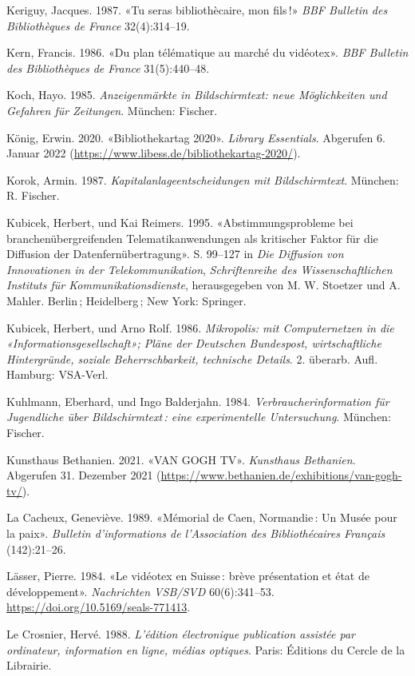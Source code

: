 \documentclass[a4paper,
fontsize=11pt,
oneside,
numbers=noperiodatend,
parskip=half-,
bibliography=totoc,
final
]{scrartcl}
\begin{document}
Keriguy, Jacques. 1987. «Tu seras bibliothècaire, mon fils\,!» \emph{BBF
Bulletin des Bibliothèques de France} 32(4):314--19.

Kern, Francis. 1986. «Du plan télématique au marché du vidéotex».
\emph{BBF Bulletin des Bibliothèques de France} 31(5):440--48.

Koch, Hayo. 1985. \emph{Anzeigenmärkte in Bildschirmtext: neue
Möglichkeiten und Gefahren für Zeitungen}. München: Fischer.

König, Erwin. 2020. «Bibliothekartag 2020». \emph{Library Essentials}.
Abgerufen 6. Januar 2022
(\url{https://www.libess.de/bibliothekartag-2020/}).

Korok, Armin. 1987. \emph{Kapitalanlageentscheidungen mit
Bildschirmtext}. München: R. Fischer.

Kubicek, Herbert, und Kai Reimers. 1995. «Abstimmungsprobleme bei
branchenübergreifenden Telematikanwendungen als kritischer Faktor für
die Diffusion der Datenfernübertragung». S. 99--127 in \emph{Die
Diffusion von Innovationen in der Telekommunikation},
\emph{Schriftenreihe des Wissenschaftlichen Instituts für
Kommunikationsdienste}, herausgegeben von M. W. Stoetzer und A. Mahler.
Berlin\,; Heidelberg\,; New York: Springer.

Kubicek, Herbert, und Arno Rolf. 1986. \emph{Mikropolis: mit
Computernetzen in die «Informationsgesellschaft»; Pläne der Deutschen
Bundespost, wirtschaftliche Hintergründe, soziale Beherrschbarkeit,
technische Details}. 2. überarb. Aufl. Hamburg: VSA-Verl.

Kuhlmann, Eberhard, und Ingo Balderjahn. 1984.
\emph{Verbraucherinformation für Jugendliche über Bildschirmtext\,: eine
experimentelle Untersuchung}. München: Fischer.

Kunsthaus Bethanien. 2021. «VAN GOGH TV». \emph{Kunsthaus Bethanien}.
Abgerufen 31. Dezember 2021
(\url{https://www.bethanien.de/exhibitions/van-gogh-tv/}).

La Cacheux, Geneviève. 1989. «Mémorial de Caen, Normandie\,: Un Musée
pour la paix». \emph{Bulletin d'informations de l'Association des
Bibliothécaires Français} (142):21--26.

Lässer, Pierre. 1984. «Le vidéotex en Suisse\,: brève présentation et
état de développement». \emph{Nachrichten VSB/SVD} 60(6):341--53.
\url{https://doi.org/10.5169/seals-771413}.

Le Crosnier, Hervé. 1988. \emph{L'édition électronique publication
assistée par ordinateur, information en ligne, médias optiques}. Paris:
Éditions du Cercle de la Librairie.
\end{document}
